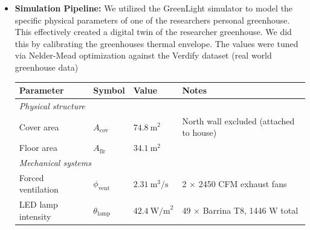 \documentclass{article}
\begin{document}
\begin{itemize}
    \item \textbf{Simulation Pipeline:} We utilized the GreenLight simulator to model the specific physical parameters of one of the researchers personal greenhouse. This effectively created a digital twin of the researcher greenhouse. We did this by calibrating the greenhouses thermal envelope. The values were tuned via Nelder-Mead optimization against the Verdify dataset (real world greenhouse data) \begin{table}[h]                       
  \centering                                                                                                                      
      \label{tab:greenlight-params}               
      \begin{tabular}{llll}                                                                                                              
      \hline                                                                                                                             
      \textbf{Parameter} & \textbf{Symbol} & \textbf{Value} & \textbf{Notes} \\                                                          
      \hline                                                                                                                             
      \multicolumn{4}{l}{\textit{Physical structure}} \\                                                                                 
      Cover area          & $A_{\text{cov}}$       & $74.8\ \text{m}^2$          & North wall excluded (attached to house) \\
      Floor area          & $A_{\text{flr}}$       & $34.1\ \text{m}^2$          & \\                                                    
      \hline                                      
      \multicolumn{4}{l}{\textit{Mechanical systems}} \\                                                                                 
      Forced ventilation  & $\phi_{\text{vent}}$   & $2.31\ \text{m}^3/\text{s}$ & 2 $\times$ 2450 CFM exhaust fans \\                   
      LED lamp intensity  & $\theta_{\text{lamp}}$ & $42.4\ \text{W/m}^2$        & 49 $\times$ Barrina T8, 1446 W total \\               
      \hline                                                        
    

\end{tabular}
\end{table}
\end{itemize}
\end{document}
